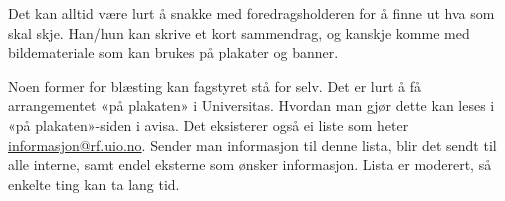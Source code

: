 Det kan alltid være lurt å snakke med foredragsholderen for å finne ut
hva som skal skje. Han/hun kan skrive et kort sammendrag, og kanskje komme
med bildemateriale som kan brukes på plakater og banner.

Noen former for blæsting kan fagstyret stå for selv. Det er lurt å få 
arrangementet «på plakaten» i Universitas. Hvordan man gjør dette kan leses
i «på plakaten»-siden i avisa. Det eksisterer også ei liste som heter
\url{informasjon@rf.uio.no}. Sender man informasjon til denne lista, blir
det sendt til alle interne, samt endel eksterne som ønsker informasjon.
Lista er moderert, så enkelte ting kan ta lang tid.

